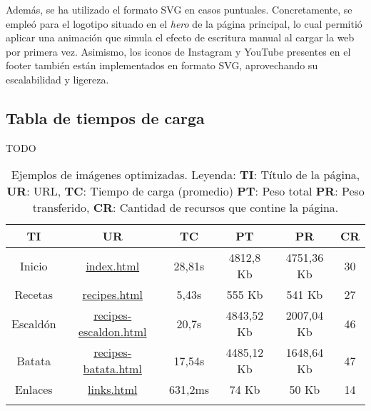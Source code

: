 \documentclass{article}
\begin{document}
Además, se ha utilizado el formato SVG en casos puntuales. Concretamente, se empleó para el logotipo situado en el \textit{hero} de la página principal, lo cual permitió aplicar una animación que simula el efecto de escritura manual al cargar la web por primera vez. Asimismo, los iconos de Instagram y YouTube presentes en el footer también están implementados en formato SVG, aprovechando su escalabilidad y ligereza.

\subsection{Tabla de tiempos de carga}\label{subsec:tabla-de-tiempos-de-carga}

TODO

\begin{longtable}{c|c|c|c|c|c}
    \hline
    \textbf{TI} & \textbf{UR} & \textbf{TC} & \textbf{PT} & \textbf{PR} & \textbf{CR} \\
    \endhead
    \hline
    Inicio & \href{https://www.danielramos.me/hhyc-dramosac/index.html}{index.html} & 28,81s & 4812,8 Kb & 4751,36 Kb & 30 \\
    Recetas & \href{https://www.danielramos.me/hhyc-dramosac/recipes.html}{recipes.html} & 5,43s & 555 Kb & 541 Kb & 27 \\
    Escaldón & \href{https://www.danielramos.me/hhyc-dramosac/recipes-escaldon.html}{recipes-escaldon.html} & 20,7s & 4843,52 Kb & 2007,04 Kb & 46 \\
    Batata & \href{https://www.danielramos.me/hhyc-dramosac/recipes-batata.html}{recipes-batata.html} & 17,54s & 4485,12 Kb & 1648,64 Kb & 47 \\
    Enlaces & \href{https://www.danielramos.me/hhyc-dramosac/links.html}{links.html} & 631,2ms & 74 Kb & 50 Kb & 14 \\
    \hline
    \caption{
        Ejemplos de imágenes optimizadas.
        Leyenda: 
        \textbf{TI}: Título de la página, 
        \textbf{UR}: URL, 
        \textbf{TC}: Tiempo de carga (promedio) 
        \textbf{PT}: Peso total 
        \textbf{PR}: Peso transferido, 
        \textbf{CR}: Cantidad de recursos que contine la página.
    }
    \label{tab:imagenes-optimizadas}
\end{longtable}
\end{document}

